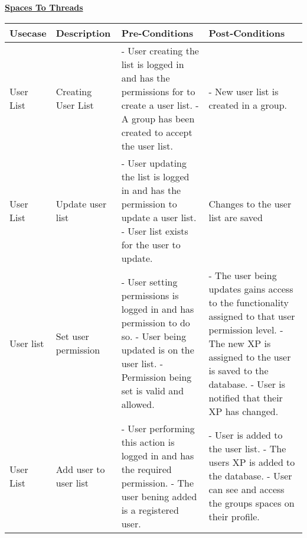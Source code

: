 \documentclass{report}
\begin{document}
	
	\underline{\textbf{\LARGE Spaces To Threads}}

	\begin{table}[h]
		\begin{tabular}{@{}|p{2cm}|p{3cm}|p{4cm}|p{4cm}|@{}}
			\toprule
			Usecase & 
			Description & 
			Pre-Conditions & 
			Post-Conditions \\ \midrule
			
			User List & 
			Creating User List &
			- User creating the list is logged in and has the permissions for to create a user list. \newline
			- A group has been created to accept the user list. & - New user list is created in a group.\\ \midrule
			
			User List & 
			Update user list & 
			- User updating the list is logged in and has the permission to update a user list. \newline 
			- User list exists for the user to update. & 
			Changes to the user list are saved \\ \midrule
			
			User list 
			& Set user permission 
			& - User setting permissions is logged in and has permission to do so. \newline 
			- User being updated is on the user list. - Permission being set is valid and allowed. 
			& - The user being updates gains access to the functionality assigned to that user permission level. \newline 
			- The new XP is assigned to the user is saved to the database. \newline - User is notified that their XP has changed. \\ \midrule
			
			User List 
			& Add user to user list 
			& - User performing this action is logged in and has the required permission. \newline 
			- The user bening added is a registered user.  
			& - User is added to the user list. \newline 
			- The users XP is added to the database. \newline 
			- User can see and access the groups spaces on their profile. \\ \midrule
		\end{tabular}
	\end{table}			
			
\end{document}
